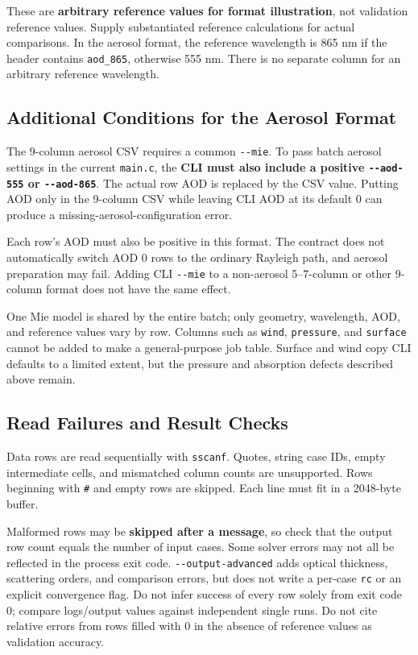 These are \textbf{arbitrary reference values for format illustration}, not validation reference values. Supply substantiated reference calculations for actual comparisons. In the aerosol format, the reference wavelength is 865 nm if the header contains \texttt{aod\_\allowbreak{}865}, otherwise 555 nm. There is no separate column for an arbitrary reference wavelength.

\subsection{Additional Conditions for the Aerosol Format}
\label{sec:auto:08_input_formats:3.3}
The 9-column aerosol CSV requires a common \texttt{-\allowbreak{}-\allowbreak{}mie}. To pass batch aerosol settings in the current \texttt{main.\allowbreak{}c}, the \textbf{CLI must also include a positive \texttt{-\allowbreak{}-\allowbreak{}aod-\allowbreak{}555} or \texttt{-\allowbreak{}-\allowbreak{}aod-\allowbreak{}865}}. The actual row AOD is replaced by the CSV value. Putting AOD only in the 9-column CSV while leaving CLI AOD at its default 0 can produce a missing-aerosol-configuration error.

Each row's AOD must also be positive in this format. The contract does not automatically switch AOD 0 rows to the ordinary Rayleigh path, and aerosol preparation may fail. Adding CLI \texttt{-\allowbreak{}-\allowbreak{}mie} to a non-aerosol 5--7-column or other 9-column format does not have the same effect.

One Mie model is shared by the entire batch; only geometry, wavelength, AOD, and reference values vary by row. Columns such as \texttt{wind}, \texttt{pressure}, and \texttt{surface} cannot be added to make a general-purpose job table. Surface and wind copy CLI defaults to a limited extent, but the pressure and absorption defects described above remain.

\subsection{Read Failures and Result Checks}
\label{sec:auto:08_input_formats:3.4}
Data rows are read sequentially with \texttt{sscanf}. Quotes, string case IDs, empty intermediate cells, and mismatched column counts are unsupported. Rows beginning with \texttt{\#} and empty rows are skipped. Each line must fit in a 2048-byte buffer.

Malformed rows may be \textbf{skipped after a message}, so check that the output row count equals the number of input cases. Some solver errors may not all be reflected in the process exit code. \texttt{-\allowbreak{}-\allowbreak{}output-\allowbreak{}advanced} adds optical thickness, scattering orders, and comparison errors, but does not write a per-case \texttt{rc} or an explicit convergence flag. Do not infer success of every row solely from exit code 0; compare logs/output values against independent single runs. Do not cite relative errors from rows filled with 0 in the absence of reference values as validation accuracy.


